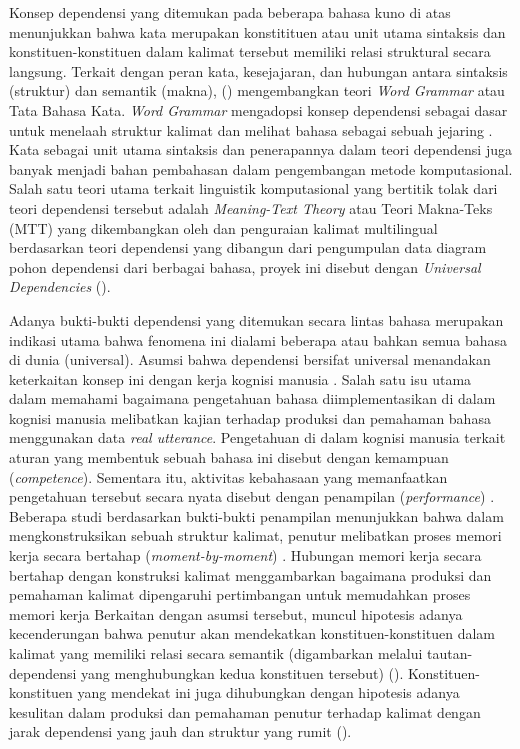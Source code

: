 Konsep dependensi yang ditemukan pada beberapa bahasa kuno di atas menunjukkan bahwa kata merupakan konstitituen atau unit utama sintaksis dan konstituen-konstituen dalam kalimat tersebut memiliki relasi struktural secara langsung. Terkait dengan peran kata, kesejajaran, dan hubungan antara sintaksis (struktur) dan semantik (makna), (\citealp{hudson1984word, hudson2007language}) mengembangkan teori \textit{Word Grammar} atau Tata Bahasa Kata. \textit{Word Grammar} mengadopsi konsep dependensi sebagai dasar untuk menelaah struktur kalimat dan melihat bahasa sebagai sebuah jejaring \citep{hudson2007language}. Kata sebagai unit utama sintaksis dan penerapannya dalam teori dependensi juga banyak menjadi bahan pembahasan dalam pengembangan metode komputasional. Salah satu teori utama terkait linguistik komputasional yang bertitik tolak dari teori dependensi tersebut adalah \textit{Meaning-Text Theory} atau Teori Makna-Teks (MTT) yang dikembangkan oleh \cite{mel'vcuk1988dependency} dan penguraian kalimat multilingual berdasarkan teori dependensi yang dibangun dari pengumpulan data diagram pohon dependensi dari berbagai bahasa, proyek ini disebut dengan \textit{Universal Dependencies} (\citealp{mcdonald2013universal, nivre2016universal, nivre2017universal}). 

Adanya bukti-bukti dependensi yang ditemukan secara lintas bahasa merupakan indikasi utama bahwa fenomena ini dialami beberapa atau bahkan semua bahasa di dunia (universal). Asumsi bahwa dependensi bersifat universal menandakan keterkaitan konsep ini dengan kerja kognisi manusia \citep{gibson2000dependency}. Salah satu isu utama dalam memahami bagaimana pengetahuan bahasa diimplementasikan di dalam kognisi manusia melibatkan kajian terhadap produksi dan pemahaman bahasa menggunakan data \textit{real utterance}. Pengetahuan di dalam kognisi manusia terkait aturan yang membentuk sebuah bahasa ini disebut dengan kemampuan (\textit{competence}). Sementara itu, aktivitas kebahasaan yang memanfaatkan pengetahuan tersebut secara nyata disebut dengan penampilan (\textit{performance}) \citep{delahuntygarvey2010soundsense}. Beberapa studi berdasarkan bukti-bukti penampilan menunjukkan bahwa dalam mengkonstruksikan sebuah struktur kalimat, penutur melibatkan proses memori kerja secara bertahap (\textit{moment-by-moment}) \citep{gibson2000dependency}. Hubungan memori kerja secara bertahap dengan konstruksi kalimat menggambarkan bagaimana produksi dan pemahaman kalimat dipengaruhi pertimbangan untuk memudahkan proses memori kerja \citep{futrell2015large} Berkaitan dengan asumsi tersebut, muncul hipotesis adanya kecenderungan bahwa penutur akan mendekatkan konstituen-konstituen dalam kalimat yang memiliki relasi secara semantik (digambarkan melalui \gls{tautan-dependensi} yang menghubungkan kedua konstituen tersebut) (\citealp{futrell2015large, liu2017dependency}). Konstituen-konstituen yang mendekat ini juga dihubungkan dengan hipotesis adanya kesulitan dalam produksi dan pemahaman penutur terhadap kalimat dengan jarak dependensi yang jauh dan struktur yang rumit (\citealp{gibson2000dependency, dillon2011structured}).

